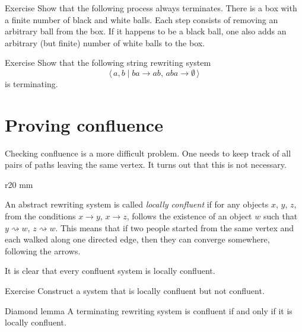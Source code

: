 \begin{thm}{Exercise}\label{ex:balls}
Show that the following process always terminates.
There is a box with a finite number of black and white balls.
Each step consists of removing an arbitrary ball from the box.
If it happens to be a black ball, one also adds an arbitrary (but finite) number of white balls to the box.
\end{thm}

\begin{thm}{Exercise}\label{ex:ab>ba,aba>}
Show that the following string rewriting system 
\[\langle\, a,b \mid ba\to ab,\, aba\to\emptyset\,\rangle\]
is terminating.
\end{thm}


\section{Proving confluence}

Checking confluence is a more difficult problem.
One needs to keep track of all pairs of paths leaving the same vertex.
It turns out that this is not necessary.

\begin{wrapfigure}{r}{20 mm}
\vskip-0mm
\centering
{}
\vskip-0mm
\end{wrapfigure}

An abstract rewriting system is called \emph{locally confluent} if for any objects $x$, $y$, $z$, from the conditions $x \to y$, $x\to z$, follows the existence of an object $w$ such that $y\rightsquigarrow  w$, $z\rightsquigarrow  w$.
This means that if two people started from the same vertex and each walked along one directed edge, then they can converge somewhere, following the arrows.

It is clear that every confluent system is locally confluent.

\begin{thm}{Exercise}\label{ex:not-confluent}
Construct a system that is locally confluent but not confluent.
\end{thm}


\begin{thm}{Diamond lemma}\label{lem:diamond}
A terminating rewriting system is confluent if and only if it is locally confluent.
\end{thm}
 


